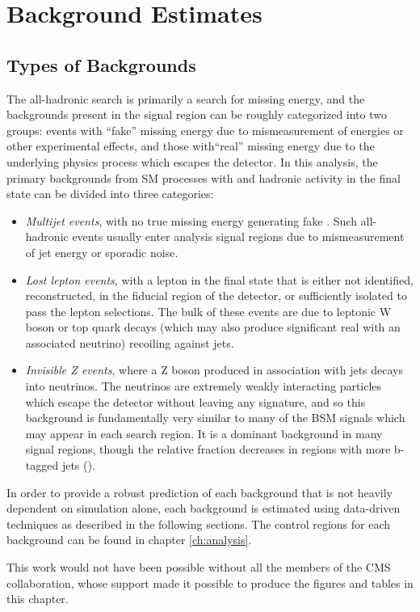 \chapter{Background Estimates}
\label{ch:bkgs}

\section{Types of Backgrounds}
\label{sec:bkgs}
The \mttwo all-hadronic search is primarily a search for missing energy, and the backgrounds present in the signal region can be roughly categorized into two groups: events with ``fake'' missing energy due to mismeasurement of energies or other experimental effects, and those with``real'' missing energy due to the underlying physics process which escapes the detector. In this analysis, the primary backgrounds from SM processes with \MET and hadronic activity in the final state can be divided into three categories:
\begin{itemize}
	\item {\it Multijet events}, with no true missing energy generating fake \MET. Such all-hadronic events usually enter analysis signal regions due to mismeasurement of jet energy or sporadic noise.
	\item {\it Lost lepton events}, with a lepton in the final state that is either not identified, reconstructed, in the fiducial region of the detector, or sufficiently isolated to pass the lepton selections. The bulk of these events are due to leptonic W boson or top quark decays (which may also produce significant real \MET with an associated neutrino) recoiling against jets.
	\item {\it Invisible Z events}, where a Z boson produced in association with jets decays into neutrinos. The neutrinos are extremely weakly interacting particles which escape the detector without leaving any signature, and so this background is fundamentally very similar to many of the BSM signals which may appear in each search region. It is a dominant background in many signal regions, though the relative fraction decreases in regions with more b-tagged jets (\nb).
\end{itemize}

In order to provide a robust prediction of each background that is not heavily dependent on simulation alone, each background is estimated using data-driven techniques as described in the following sections. The control regions for each background can be found in chapter \ref{ch:analysis}.





This work would not have been possible without all the members of the CMS collaboration, whose support made it possible to produce the figures and tables in this chapter.

